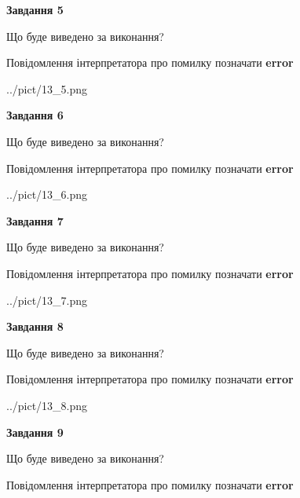 \documentclass[11pt, ukrainian]{article}
\begin{document}
{\begin {large}
{\begin {center}\textbf{Завдання 5}\end {center}}\par
Що буде виведено за виконання? \par
Повідомлення інтерпретатора про помилку позначати \textbf{error}

\begin{center}
	{../pict/13_5.png}
\end{center}
\newpage

{\begin {center}\textbf{Завдання 6}\end {center}}\par
Що буде виведено за виконання? \par
Повідомлення інтерпретатора про помилку позначати \textbf{error}

\begin{center}
	{../pict/13_6.png}
\end{center}
\newpage

{\begin {center}\textbf{Завдання 7}\end {center}}\par
Що буде виведено за виконання? \par
Повідомлення інтерпретатора про помилку позначати \textbf{error}

\begin{center}
	{../pict/13_7.png}
\end{center}
\newpage

{\begin {center}\textbf{Завдання 8}\end {center}}\par
Що буде виведено за виконання? \par
Повідомлення інтерпретатора про помилку позначати \textbf{error}

\begin{center}
	{../pict/13_8.png}
\end{center}
\newpage

{\begin {center}\textbf{Завдання 9}\end {center}}\par
Що буде виведено за виконання? \par
Повідомлення інтерпретатора про помилку позначати \textbf{error}


\end{large}}
\end{document}
